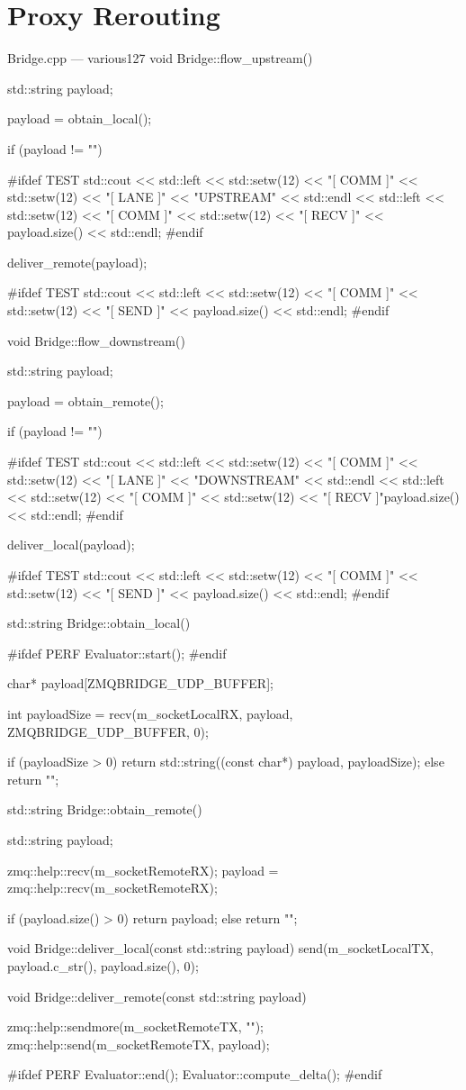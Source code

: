 \section{Proxy Rerouting}\label{ax:code:proxy}

\begin{codelist}{Bridge.cpp --- various}{127}
void Bridge::flow_upstream() {
	std::string payload;

	payload = obtain_local();

	if (payload != "") {
#ifdef TEST
		std::cout << std::left << std::setw(12) << "[ COMM ]" << std::setw(12) << "[ LANE ]" << "UPSTREAM" << std::endl
		<< std::left << std::setw(12) << "[ COMM ]" << std::setw(12) << "[ RECV ]" << payload.size() << std::endl;
#endif

		deliver_remote(payload);

#ifdef TEST
		std::cout << std::left << std::setw(12) << "[ COMM ]" << std::setw(12) << "[ SEND ]" << payload.size() << std::endl;
#endif
	}
}

void Bridge::flow_downstream() {
	std::string payload;

	payload = obtain_remote();

	if (payload != "") {
#ifdef TEST
		std::cout << std::left << std::setw(12) << "[ COMM ]" << std::setw(12) << "[ LANE ]" << "DOWNSTREAM" << std::endl
		<< std::left << std::setw(12) << "[ COMM ]" << std::setw(12) << "[ RECV ]"payload.size() << std::endl;
#endif

		deliver_local(payload);

#ifdef TEST
		std::cout << std::left << std::setw(12) << "[ COMM ]" << std::setw(12) << "[ SEND ]" << payload.size() << std::endl;
#endif
	}
}

std::string Bridge::obtain_local() {
#ifdef PERF
	Evaluator::start();
#endif

	char* payload[ZMQBRIDGE_UDP_BUFFER];

	int payloadSize = recv(m_socketLocalRX, payload, ZMQBRIDGE_UDP_BUFFER, 0);

	if (payloadSize > 0) {
		return std::string((const char*) payload, payloadSize);
	} else {
		return "";
	}
}

std::string Bridge::obtain_remote() {
	std::string payload;

	zmq::help::recv(m_socketRemoteRX);
	payload = zmq::help::recv(m_socketRemoteRX);

	if (payload.size() > 0) {
		return payload;
	} else {
		return "";
	}
}

void Bridge::deliver_local(const std::string payload) {
	send(m_socketLocalTX, payload.c_str(), payload.size(), 0);
}

void Bridge::deliver_remote(const std::string payload) {
	zmq::help::sendmore(m_socketRemoteTX, "");
	zmq::help::send(m_socketRemoteTX, payload);

#ifdef PERF
	Evaluator::end();
	Evaluator::compute_delta();
#endif
}
\end{codelist}

